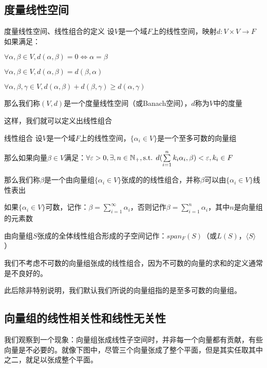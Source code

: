 \documentclass[12pt, a4paper, oneside, UTF8]{ctexbook}
\begin{document}
		\subsection{度量线性空间}
			\begin{defn}{度量线性空间、线性组合的定义}{}
				设$V$是一个域$F$上的线性空间，映射$d:V\times V \rightarrow F$如果满足：

				 $\forall \alpha ,\beta \in V,d(\alpha ,\beta )=0 \Leftrightarrow \alpha =\beta $
			
				 $\forall \alpha ,\beta \in V,d(\alpha ,\beta )=d(\beta ,\alpha )$

				 $\forall \alpha,\beta,\gamma \in V,d(\alpha,\beta )+d(\beta ,\gamma ) \geqslant d(\alpha ,\gamma )$

				那么我们称$(V,d)$是一个度量线性空间（或Banach空间），$d$称为$V$中的度量
			\end{defn}
			这样，我们就可以定义出线性组合
			\begin{defn}{线性组合}{}
				设$V$是一个域$F$上的线性空间，$\{\alpha_i \in V\}$是一个至多可数的向量组

				那么如果向量$\beta \in V$满足：$\forall \varepsilon > 0,\exists,n \in \mathbb{N}_+,\text{s.t. }d(\sum\limits_{i=1}^{n} k_i\alpha_i,\beta ) < \varepsilon ,k_i \in F$

				那么我们称$\beta$是一个由向量组$\{\alpha_i \in V\}$张成的的线性组合，并称$\beta $可以由$\{\alpha_i \in V\}$线性表出
				
				如果$\{\alpha_i \in V\}$可数，记作：$\beta =\sum\limits_{i=1}^{\infty} \alpha_i$，否则记作$\beta =\sum\limits_{i=1}^{n} \alpha_i$，其中$n$是向量组的元素数

				由向量组$S$张成的全体线性组合形成的子空间记作：$span_F (S)$（或$L(S)$，$\langle S \rangle $）
			\end{defn}
			我们不考虑不可数的向量组张成的线性组合，因为不可数的向量的求和的定义通常是不良好的。

			此后除非特别说明，我们默认我们所说的向量组指的是至多可数的向量组。
		\subsection{向量组的线性相关性和线性无关性}
			我们观察到一个现象：向量组张成线性子空间时，并非每一个向量都有贡献，有些向量是不必要的。就像下图中，尽管三个向量张成了整个平面，但是其实任取其中之二，就足以张成整个平面。
\end{document}
